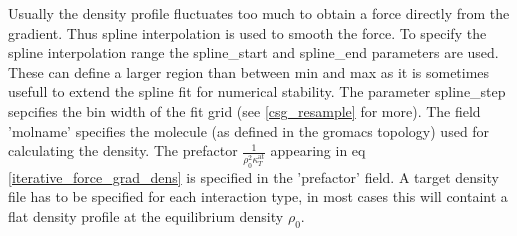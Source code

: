 Usually the density profile fluctuates too much to obtain a force directly from the gradient. Thus spline interpolation is used to smooth the force. To specify the spline interpolation range the spline\_start and spline\_end parameters are used. These can define a larger region than between min and max as it is sometimes usefull to extend the spline fit for numerical stability. The parameter spline\_step sepcifies the bin width of the fit grid (see \ref{csg_resample} for more). 
The field 'molname' specifies the molecule (as defined in the gromacs topology) used for calculating the density. 
The prefactor $\frac{1}{\rho_0^2 \kappa_T^\text{at}}$ appearing in eq \ref{iterative_force_grad_dens} is specified in the 'prefactor' field.
A target density file has to be specified for each interaction type, in most cases this will containt a flat density profile at the equilibrium density $\rho_0$. \\